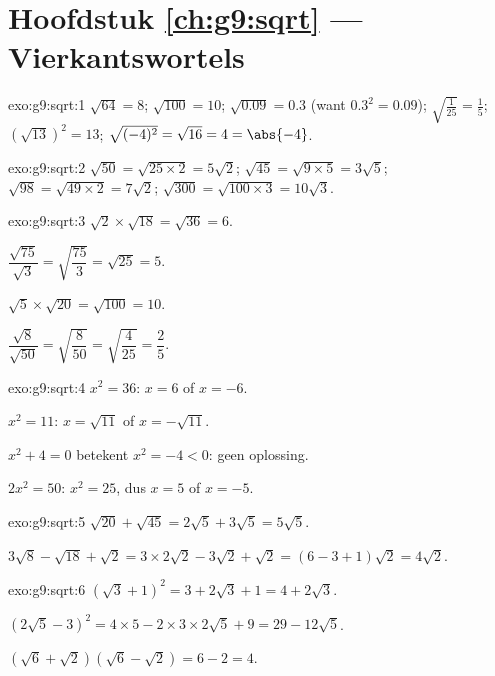 \section*{Hoofdstuk \ref{ch:g9:sqrt} --- Vierkantswortels}

\begin{solution}{exo:g9:sqrt:1}
$\sqrt{64} = 8$; \quad $\sqrt{100} = 10$; \quad
$\sqrt{0.09} = 0.3$ (want $0.3^2 = 0.09$); \quad
$\sqrt{\frac{1}{25}} = \frac15$; \quad
$\left(\sqrt{13}\right)^2 = 13$; \quad
$\sqrt{(-4)^2} = \sqrt{16} = 4 = \abs{-4}$.
\end{solution}

\begin{solution}{exo:g9:sqrt:2}
$\sqrt{50} = \sqrt{25 \times 2} = 5\sqrt2$; \quad
$\sqrt{45} = \sqrt{9 \times 5} = 3\sqrt5$; \quad
$\sqrt{98} = \sqrt{49 \times 2} = 7\sqrt2$; \quad
$\sqrt{300} = \sqrt{100 \times 3} = 10\sqrt3$.
\end{solution}

\begin{solution}{exo:g9:sqrt:3}
$\sqrt2 \times \sqrt{18} = \sqrt{36} = 6$.

$\dfrac{\sqrt{75}}{\sqrt3} = \sqrt{\dfrac{75}{3}} = \sqrt{25} = 5$.

$\sqrt5 \times \sqrt{20} = \sqrt{100} = 10$.

$\dfrac{\sqrt8}{\sqrt{50}} = \sqrt{\dfrac{8}{50}} = \sqrt{\dfrac{4}{25}}
= \dfrac25$.
\end{solution}

\begin{solution}{exo:g9:sqrt:4}
$x^2 = 36$: $x = 6$ of $x = -6$.

$x^2 = 11$: $x = \sqrt{11}$ of $x = -\sqrt{11}$.

$x^2 + 4 = 0$ betekent $x^2 = -4 < 0$: geen oplossing.

$2x^2 = 50$: $x^2 = 25$, dus $x = 5$ of $x = -5$.
\end{solution}

\begin{solution}{exo:g9:sqrt:5}
$\sqrt{20} + \sqrt{45} = 2\sqrt5 + 3\sqrt5 = 5\sqrt5$.

$3\sqrt8 - \sqrt{18} + \sqrt2 = 3 \times 2\sqrt2 - 3\sqrt2 + \sqrt2
= (6 - 3 + 1)\sqrt2 = 4\sqrt2$.
\end{solution}

\begin{solution}{exo:g9:sqrt:6}
$\left(\sqrt3 + 1\right)^2 = 3 + 2\sqrt3 + 1 = 4 + 2\sqrt3$.

$\left(2\sqrt5 - 3\right)^2 = 4 \times 5 - 2 \times 3 \times 2\sqrt5 + 9
= 29 - 12\sqrt5$.

$\left(\sqrt6 + \sqrt2\right)\left(\sqrt6 - \sqrt2\right) = 6 - 2 = 4$.
\end{solution}

